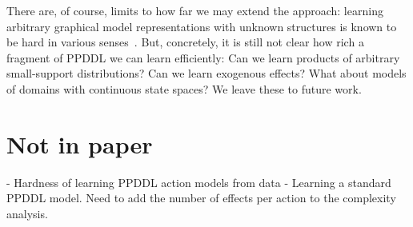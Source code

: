 \documentclass[letterpaper]{article} %
\begin{document}
There are, of course, limits to how far we may extend the approach: learning arbitrary graphical model representations with unknown structures is known to be hard in various senses~\cite{chickering1996learning,chickering2004large}. But, concretely, it is still not clear how rich a fragment of PPDDL we can learn efficiently: Can we learn products of arbitrary small-support distributions? Can we learn exogenous effects?  What about models of domains with continuous state spaces? We leave these to future work.



\section{Not in paper}

- Hardness of learning PPDDL action models from data
- Learning a standard PPDDL model. Need to add the number of effects per action to the complexity analysis. 








\end{document}
